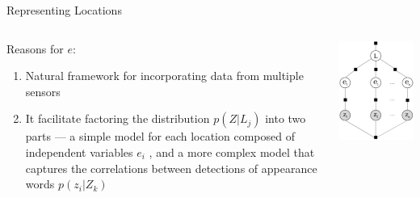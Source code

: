 \begin{frame}{Representing Locations}
    \begin{columns}
        \begin{column}{0.7\textwidth}
            Reasons for $e$:
            \begin{enumerate}
                \item Natural framework for incorporating data from multiple sensors
                \item It facilitate factoring the distribution $p(Z|L_j)$ into two parts — a simple model for each location composed of independent variables $e_i$ , and a more complex model that captures the correlations between detections of appearance words $p(z_i|Z_k)$
            \end{enumerate}
        \end{column}

        \begin{column}{0.3\textwidth}
            \includegraphics[width=\textwidth]{./media/event.png}
        \end{column}
    \end{columns}
\end{frame}

